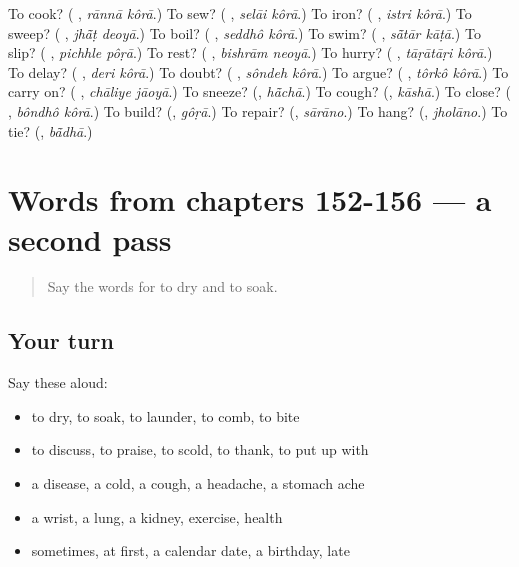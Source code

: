\begin{tcolorbox}[breakable,colback=teal!4,colframe=teal!35!black,title={Before you move on}]
To cook? (\textbf{ }, \emph{rānnā kôrā}.) To sew? (\textbf{ }, \emph{selāi kôrā}.) To iron? (\textbf{ }, \emph{istri kôrā}.) To sweep? (\textbf{ }, \emph{jhā̃ṭ deoyā}.) To boil? (\textbf{ }, \emph{seddhô kôrā}.) To swim? (\textbf{ }, \emph{sā̃tār kāṭā}.) To slip? (\textbf{ }, \emph{pichhle pôṛā}.) To rest? (\textbf{ }, \emph{bishrām neoyā}.) To hurry? (\textbf{ }, \emph{tāṛātāṛi kôrā}.) To delay? (\textbf{ }, \emph{deri kôrā}.) To doubt? (\textbf{ }, \emph{sôndeh kôrā}.) To argue? (\textbf{ }, \emph{tôrkô kôrā}.) To carry on? (\textbf{ }, \emph{chāliye jāoyā}.) To sneeze? (\textbf{}, \emph{hā̃chā}.) To cough? (\textbf{}, \emph{kāshā}.) To close? (\textbf{ }, \emph{bôndhô kôrā}.) To build? (\textbf{}, \emph{gôṛā}.) To repair? (\textbf{}, \emph{sārāno}.) To hang? (\textbf{}, \emph{jholāno}.) To tie? (\textbf{}, \emph{bā̃dhā}.)
\end{tcolorbox}
\section[(dialogue)]{Words from chapters 152-156 — a second pass}

\label{lesson:BN-R156-second-pass-words-from-chapters-152-156}



\begin{quote}
Say the words for to dry and to soak.
\end{quote}

\subsection*{Your turn}
Say these aloud:

\begin{itemize}
\raggedright
  \item to dry, to soak, to launder, to comb, to bite
  \item to discuss, to praise, to scold, to thank, to put up with
  \item a disease, a cold, a cough, a headache, a stomach ache
  \item a wrist, a lung, a kidney, exercise, health
  \item sometimes, at first, a calendar date, a birthday, late
\end{itemize}

